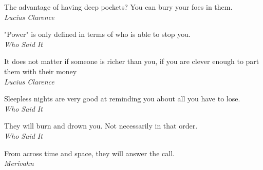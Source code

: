 \begin{rpg-quotebox}
The advantage of having deep pockets? You can bury your foes in them. \\ \textendash \textit{Lucius Clarence}
\end{rpg-quotebox}

\begin{rpg-quotebox}
"Power" is only defined in terms of who is able to stop you. \\ \textendash \textit{Who Said It}
\end{rpg-quotebox}

\begin{rpg-quotebox}
It does not matter if someone is richer than you, if you are clever enough to part them with their money \\ \textendash \textit{Lucius Clarence}
\end{rpg-quotebox}

\begin{rpg-quotebox}
Sleepless nights are very good at reminding you about all you have to lose. \\ \textendash \textit{Who Said It}
\end{rpg-quotebox}

\begin{rpg-quotebox}
They will burn and drown you. Not necessarily in that order. \\ \textendash \textit{Who Said It}
\end{rpg-quotebox}

\begin{rpg-quotebox}
From across time and space, they will answer the call. \\ \textendash \textit{Merivahn}
\end{rpg-quotebox}